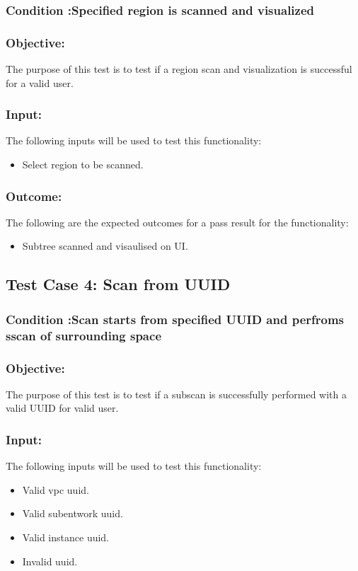 \documentclass[hidelinks,a4paper,12pt]{article}
\begin{document}
\subsubsection{Condition :Specified region  is scanned and visualized}
\subsubsection{Objective:} The purpose of this test is to test if a region scan and visualization is successful for a valid user.

\subsubsection{Input:}
 The following inputs will be used to test this functionality:
\begin{itemize}
  \item Select region to be scanned.
\end{itemize}
\subsubsection{Outcome: }
The following are the expected outcomes for a pass result for the functionality:
\begin{itemize}
\item Subtree scanned and visaulised on UI.
\end{itemize}


\subsection{Test Case 4: Scan from UUID}
\subsubsection{Condition :Scan starts from specified UUID and perfroms sscan of surrounding space}
\subsubsection{Objective:} The purpose of this test is to test if a subscan is successfully performed with a valid UUID for valid user.

\subsubsection{Input:}
 The following inputs will be used to test this functionality:
\begin{itemize}
  \item Valid vpc uuid.
  \item Valid subentwork uuid.
 \item Valid instance uuid.
\item Invalid uuid.

\end{itemize}
\end{document}
